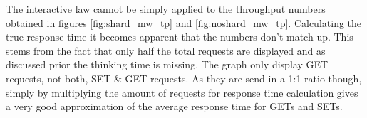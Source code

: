         The interactive law cannot be simply applied to the throughput numbers obtained in figures \ref{fig:shard_mw_tp}
        and \ref{fig:noshard_mw_tp}. Calculating the true response time it becomes apparent that the numbers don't match up.
        This stems from the fact that only half the total requests are displayed and as discussed prior the thinking
        time is missing. The graph only display GET requests, not both, SET \& GET requests. As they are send in a 1:1
        ratio though, simply by multiplying the amount of requests for response time calculation gives a very good
        approximation of the average response time for GETs and SETs.
